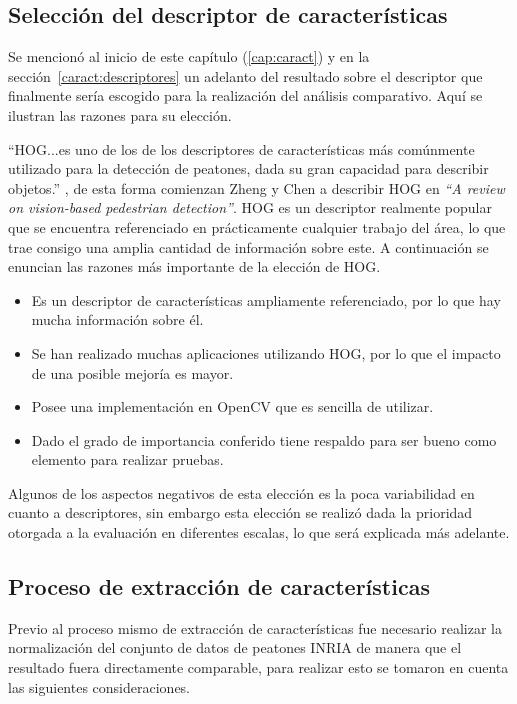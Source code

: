 \subsection{Selección del descriptor de características}

Se mencionó al inicio de este capítulo (\ref{cap:caract}) y en la sección~\ref{caract:descriptores} un adelanto del resultado sobre el descriptor que finalmente sería escogido para la realización del análisis comparativo. Aquí se ilustran las razones para su elección.

``HOG...es uno de los de los descriptores de características más comúnmente utilizado para la detección de peatones, dada su gran capacidad para describir objetos.'' \citep{Zheng2012}, de esta forma comienzan Zheng y Chen a describir HOG en \textit{``A review on vision-based pedestrian detection''}. HOG es un descriptor realmente popular que se encuentra referenciado en prácticamente cualquier trabajo del área, lo que trae consigo una amplia cantidad de información sobre este. A continuación se enuncian las razones más importante de la elección de HOG.

\begin{itemize}
\item Es un descriptor de características ampliamente referenciado, por lo que hay mucha información sobre él.
\item Se han realizado muchas aplicaciones utilizando HOG, por lo que el impacto de una posible mejoría es mayor.
\item Posee una implementación en OpenCV que es sencilla de utilizar.
\item Dado el grado de importancia conferido tiene respaldo para ser bueno como elemento para realizar pruebas.
\end{itemize}

Algunos de los aspectos negativos de esta elección es la poca variabilidad en cuanto a descriptores, sin embargo esta elección se realizó dada la prioridad otorgada a la evaluación en diferentes escalas, lo que será explicada más adelante.

\subsection{Proceso de extracción de características}
\label{caract:extraccion}

Previo al proceso mismo de extracción de características fue necesario realizar la normalización del conjunto de datos de peatones INRIA de manera que el resultado fuera directamente comparable, para realizar esto se tomaron en cuenta las siguientes consideraciones.

